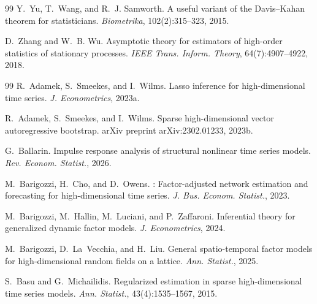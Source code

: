 \documentclass[12pt]{article}
\begin{document}
\begin{thebibliography}{99}
Y.~Yu, T.~Wang, and R.~J. Samworth.
\newblock A useful variant of the {D}avis--{K}ahan theorem for statisticians.
\newblock \emph{Biometrika}, 102(2):315--323, 2015.

D.~Zhang and W.~B. Wu.
\newblock Asymptotic theory for estimators of high-order statistics of stationary processes.
\newblock \emph{IEEE Trans. Inform. Theory}, 64(7):4907--4922, 2018.

\end{thebibliography}

\clearpage
{
\renewcommand{\refname}{Further Reading}
\renewcommand{\bibpreamble}{Papers recommended by Wei Biao Wu.\par\medskip}
{}
\begin{thebibliography}{99}
\setlength{\itemsep}{0.3em}
R.~Adamek, S.~Smeekes, and I.~Wilms.
\newblock Lasso inference for high-dimensional time series.
\newblock \emph{J. Econometrics}, 2023a.

R.~Adamek, S.~Smeekes, and I.~Wilms.
\newblock Sparse high-dimensional vector autoregressive bootstrap.
\newblock arXiv preprint arXiv:2302.01233, 2023b.

G.~Ballarin.
\newblock Impulse response analysis of structural nonlinear time series models.
\newblock \emph{Rev. Econom. Statist.}, 2026.

M.~Barigozzi, H.~Cho, and D.~Owens.
: Factor-adjusted network estimation and forecasting for high-dimensional time series.
\newblock \emph{J. Bus. Econom. Statist.}, 2023.

M.~Barigozzi, M.~Hallin, M.~Luciani, and P.~Zaffaroni.
\newblock Inferential theory for generalized dynamic factor models.
\newblock \emph{J. Econometrics}, 2024.

M.~Barigozzi, D.~La~Vecchia, and H.~Liu.
\newblock General spatio-temporal factor models for high-dimensional random fields on a lattice.
\newblock \emph{Ann. Statist.}, 2025.

S.~Basu and G.~Michailidis.
\newblock Regularized estimation in sparse high-dimensional time series models.
\newblock \emph{Ann. Statist.}, 43(4):1535--1567, 2015.


\end{thebibliography}}
\end{document}
